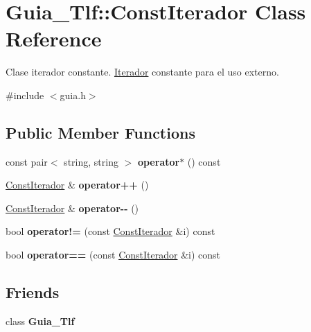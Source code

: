 \hypertarget{classGuia__Tlf_1_1ConstIterador}{}\section{Guia\+\_\+\+Tlf\+:\+:Const\+Iterador Class Reference}
\label{classGuia__Tlf_1_1ConstIterador}


Clase iterador constante. \hyperlink{classGuia__Tlf_1_1Iterador}{Iterador} constante para el uso externo.  




{\ttfamily \#include $<$guia.\+h$>$}

\subsection*{Public Member Functions}
\begin{DoxyCompactItemize}
\item 
\mbox{\label{classGuia__Tlf_1_1ConstIterador_a9dcb373adf20c0a2a2d3dd75ef1af799}} 
const pair$<$ string, string $>$ {\bfseries operator$\ast$} () const
\item 
\mbox{\label{classGuia__Tlf_1_1ConstIterador_aa960573ed8410902f900951c58b52d42}} 
\hyperlink{classGuia__Tlf_1_1ConstIterador}{Const\+Iterador} \& {\bfseries operator++} ()
\item 
\mbox{\label{classGuia__Tlf_1_1ConstIterador_a59233dd4f3ad4bef506f49bdc07ec59b}} 
\hyperlink{classGuia__Tlf_1_1ConstIterador}{Const\+Iterador} \& {\bfseries operator-\/-\/} ()
\item 
\mbox{\label{classGuia__Tlf_1_1ConstIterador_a3854a7212f82995793f7807800fea68e}} 
bool {\bfseries operator!=} (const \hyperlink{classGuia__Tlf_1_1ConstIterador}{Const\+Iterador} \&i) const
\item 
\mbox{\label{classGuia__Tlf_1_1ConstIterador_a87c5508fb6b80b179fb946aa421071b3}} 
bool {\bfseries operator==} (const \hyperlink{classGuia__Tlf_1_1ConstIterador}{Const\+Iterador} \&i) const
\end{DoxyCompactItemize}
\subsection*{Friends}
\begin{DoxyCompactItemize}
\item 
\mbox{\label{classGuia__Tlf_1_1ConstIterador_a4349d7a1b26a0aa94447235f95b2f940}} 
class {\bfseries Guia\+\_\+\+Tlf}
\end{DoxyCompactItemize}


